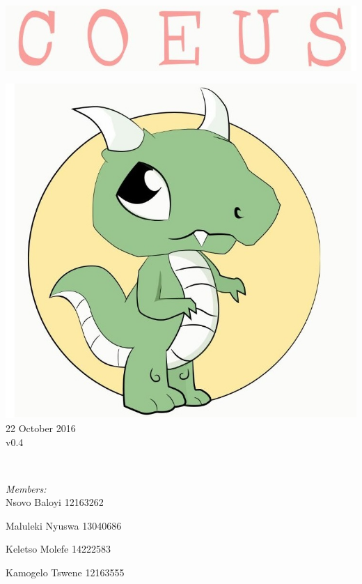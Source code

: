 \documentclass[a4paper,12pt]{article}
\begin{document}
\begin{titlepage}
	\includegraphics[width=\textwidth]{../name} \\[1cm]
	\begin{minipage}{0.4\textwidth}
	\begin{flushleft} \large
	\includegraphics[width=\textwidth]{../logo} \\[0.5cm]
	{\large 22 October 2016}\\
	{\large v0.4}
	\end{flushleft}
	\end{minipage}
	~
	\begin{minipage}{0.5\textwidth}
	\begin{flushright} \large
	\emph{Members:}\\%
	Nsovo Baloyi 12163262

	Maluleki Nyuswa 13040686
	
	Keletso Molefe 14222583
	
	Kamogelo Tswene 12163555

	\end{flushright}
	\end{minipage}\\[4cm]
\end{titlepage}
\end{document}
